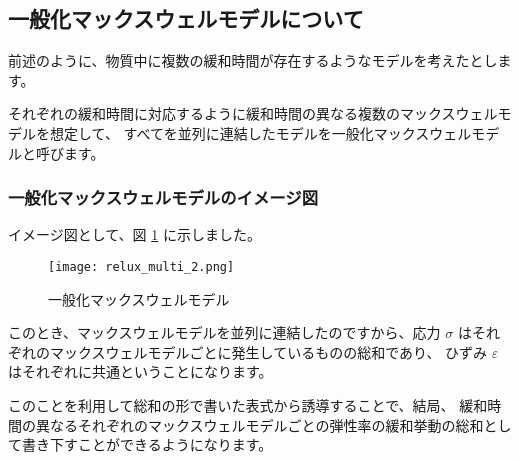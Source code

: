 \documentclass[uplatex,dvipdfmx,a4paper,11pt]{jsarticle}
\begin{document}
\subsection{一般化マックスウェルモデルについて}
前述のように、物質中に複数の緩和時間が存在するようなモデルを考えたとします。

それぞれの緩和時間に対応するように緩和時間の異なる複数のマックスウェルモデルを想定して、
すべてを並列に連結したモデルを一般化マックスウェルモデルと呼びます。

\subsubsection{一般化マックスウェルモデルのイメージ図}
イメージ図として、図 \ref{fig:gen_maxwell} に示しました。
\begin{figure}[htb]
	\begin{center}
		\begin{minipage}{0.9\textwidth}
			\begin{center}
			\texttt{[image: relux\_multi\_2.png]}
			\end{center}
		\end{minipage}
		\caption{一般化マックスウェルモデル}
		\label{fig:gen_maxwell}
	\end{center}
\end{figure}

このとき、マックスウェルモデルを並列に連結したのですから、応力 $\sigma$ はそれぞれのマックスウェルモデルごとに発生しているものの総和であり、
ひずみ $\varepsilon$ はそれぞれに共通ということになります。

このことを利用して総和の形で書いた表式から誘導することで、結局、
緩和時間の異なるそれぞれのマックスウェルモデルごとの弾性率の緩和挙動の総和として書き下すことができるようになります。
\end{document}
